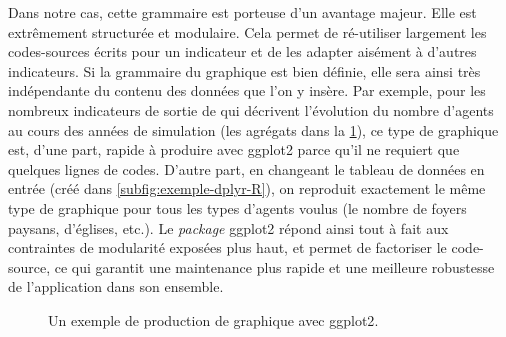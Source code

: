 Dans notre cas, cette grammaire est porteuse d'un avantage majeur.
Elle est extrêmement structurée et modulaire.
Cela permet de ré-utiliser largement les codes-sources écrits pour un indicateur et de les adapter aisément à d'autres indicateurs.
Si la grammaire du graphique est bien définie, elle sera ainsi très indépendante du contenu des données que l'on y insère.
Par exemple, pour les nombreux indicateurs de sortie de \simfeodal{} qui décrivent l'évolution du nombre d'agents au cours des années de simulation (les agrégats dans la \cref{fig:exemple-ggplot2-simedb}), ce type de graphique est, d'une part, rapide à produire avec \textsf{ggplot2} parce qu'il ne requiert que quelques lignes de codes.
D'autre part, en changeant le tableau de données en entrée (créé dans \cref{subfig:exemple-dplyr-R}), on reproduit exactement le même type de graphique pour tous les types d'agents voulus (le nombre de foyers paysans, d'églises, etc.).
Le \textit{package} \textsf{ggplot2} répond ainsi tout à fait aux contraintes de modularité exposées plus haut, et permet de factoriser le code-source, ce qui garantit une maintenance plus rapide et une meilleure robustesse de l'application dans son ensemble.

\begin{figure}[H]
	\centering
	\hspace{5pt}
	\hspace{5pt}
	\caption{Un exemple de production de graphique avec \textsf{ggplot2}.}
	\label{fig:exemple-ggplot2-simedb}
\end{figure}

